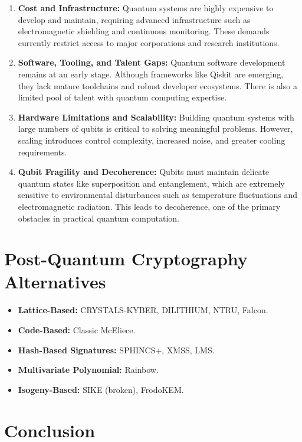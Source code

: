 \documentclass{article}
\begin{document}
\begin{enumerate}
    \item \textbf{Cost and Infrastructure:} Quantum systems are highly expensive to develop and maintain, requiring advanced infrastructure such as electromagnetic shielding and continuous monitoring. These demands currently restrict access to major corporations and research institutions.

    \item \textbf{Software, Tooling, and Talent Gaps:} Quantum software development remains at an early stage. Although frameworks like Qiskit are emerging, they lack mature toolchains and robust developer ecosystems. There is also a limited pool of talent with quantum computing expertise.

    \item \textbf{Hardware Limitations and Scalability:} Building quantum systems with large numbers of qubits is critical to solving meaningful problems. However, scaling introduces control complexity, increased noise, and greater cooling requirements.

    \item \textbf{Qubit Fragility and Decoherence:} Qubits must maintain delicate quantum states like superposition and entanglement, which are extremely sensitive to environmental disturbances such as temperature fluctuations and electromagnetic radiation. This leads to decoherence, one of the primary obstacles in practical quantum computation.
\end{enumerate}

\section{Post-Quantum Cryptography Alternatives}

\begin{itemize}
    \item \textbf{Lattice-Based:} CRYSTALS-KYBER, DILITHIUM, NTRU, Falcon.
    \item \textbf{Code-Based:} Classic McEliece.
    \item \textbf{Hash-Based Signatures:} SPHINCS+, XMSS, LMS.
    \item \textbf{Multivariate Polynomial:} Rainbow.
    \item \textbf{Isogeny-Based:} SIKE (broken), FrodoKEM.
\end{itemize}

\newpage

\section{Conclusion}
\end{document}

